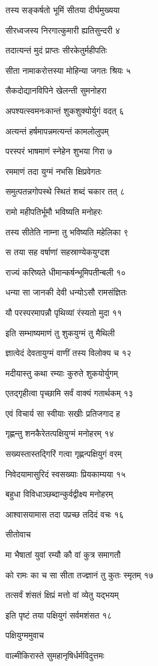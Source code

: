 तस्य सङ्कर्षतो भूमिं सीतया दीर्घमुख्यया

सीरध्वजस्य निरगात्कुमारी ह्यतिसुन्दरी ४

तदात्यन्तं मुदं प्राप्तः सीरकेतुर्महीपतिः

सीता नामाकरोत्तस्या मोहिन्या जगतः श्रियः ५

सैकदोद्यानविपिने खेलन्ती सुमनोहरा

अपश्यत्स्वमनःकान्तं शुकशुक्योर्युगं वदत् ६

अत्यन्तं हर्षमापन्नमत्यन्तं कामलोलुपम्

परस्परं भाषमाणं स्नेहेन शुभया गिरा ७

रममाणं तदा युग्मं नभसि क्षिप्रवेगतः

समुत्पतन्नगोपस्थे स्थितं शब्दं चकार तत् ८

रामो महीपतिर्भूमौ भविष्यति मनोहरः

तस्य सीतेति नाम्ना तु भविष्यति महेलिका ९

स तया सह वर्षाणां सहस्राण्येकयुग्दश

राज्यं करिष्यते धीमान्कर्षन्भूमिपतीन्बली १०

धन्या सा जानकी देवी धन्योऽसौ रामसंज्ञितः

यौ परस्परमापन्नौ पृथिव्यां रंस्यतो मुदा ११

इति सम्भाष्यमाणं तु शुकयुग्मं तु मैथिली

ज्ञात्वेदं देवतायुग्मं वाणीं तस्य विलोक्य च १२

मदीयास्तु कथा रम्याः कुरुते शुकयोर्युगम्

एतद्गृहीत्वा पृच्छामि सर्वं वाक्यं गतार्थकम् १३

एवं विचार्य सा स्वीयाः सखीः प्रतिजगाद ह

गृह्णन्तु शनकैरेतत्पक्षियुग्मं मनोहरम् १४

सख्यस्तास्तद्गिरिं गत्वा गृह्णन्पक्षियुगं वरम्

निवेदयामासुरिदं स्वसख्याः प्रियकाम्यया १५

बहुधा विविधाञ्छब्दान्कुर्वद्वीक्ष्य मनोहरम्

आश्वासयामास तदा पप्रच्छ तदिदं वचः १६

सीतोवाच

मा भैषातां युवां रम्यौ कौ वां कुत्र समागतौ

को रामः का च सा सीता तज्ज्ञानं तु कुतः स्मृतम् १७

तत्सर्वं शंसतं क्षिप्रं मत्तो वां व्येतु यद्भयम्

इति पृष्टं तया पक्षियुगं सर्वमशंसत १८

पक्षियुग्ममुवाच

वाल्मीकिरास्ते सुमहानृषिर्धर्मविदुत्तमः

